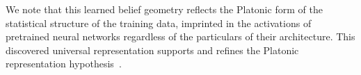 \documentclass[prx,nofootinbib,onecolumn,showkeys,groupaddress,preprintnumbers,floatfix,
superscriptaddress]{revtex4-1}
\begin{document}
We note that this 
learned belief
geometry reflects the Platonic form of the statistical structure of the training data, 
imprinted in the activations of pretrained neural networks regardless of the particulars of their architecture.
This discovered universal representation
supports and refines the 
Platonic representation hypothesis~\cite{Huh24_Position}.







\end{document}
